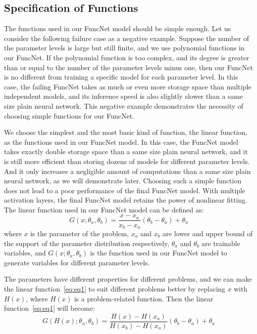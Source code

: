 \documentclass{article}
\begin{document}
\subsection{Specification of Functions} \label{sec:func}

The functions used in our FuncNet model should be simple enough. Let us consider the following failure case as a negative example. Suppose the number of the parameter levels is large but still finite, and we use polynomial functions in our FuncNet. If the polynomial function is too complex, and its degree is greater than or equal to the number of the parameter levels minus one, then our FuncNet is no different from training a specific model for each parameter level. In this case, the failing FuncNet takes as much or even more storage space than multiple independent models, and its inference speed is also slightly slower than a same size plain neural network. This negative example demonstrates the necessity of choosing simple functions for our FuncNet.

We choose the simplest and the most basic kind of function, the linear function, as the functions used in our FuncNet model. In this case, the FuncNet model takes exactly double storage space than a same size plain neural network, and it is still more efficient than storing dozens of models for different parameter levels. And it only increases a negligible amount of computations than a same size plain neural network, as we will demonstrate later. Choosing such a simple function does not lead to a poor performance of the final FuncNet model. With multiple activation layers, the final FuncNet model retains the power of nonlinear fitting. The linear function used in our FuncNet model can be defined as:
\begin{equation} \label{eq:eq1}
G(x; \theta_a, \theta_b)  = \frac{x-x_a}{x_b-x_a}(\theta_b-\theta_a) + \theta_a
\end{equation}
where $x$ is the parameter of the problem, $x_a$ and $x_b$ are lower and upper bound of the support of the parameter distribution respectively, $\theta_a$ and $\theta_b$ are trainable variables, and $G(x; \theta_a, \theta_b)$ is the function used in our FuncNet model to generate variables for different parameter levels.

The parameters have different properties for different problems, and we can make the linear function~\ref{eq:eq1} to suit different problems better by replacing $x$ with $H(x)$, where $H(x)$ is a problem-related function. Then the linear function~\ref{eq:eq1} will become:
\begin{equation} \label{eq:eq2}
G(H(x); \theta_a, \theta_b)  = \frac{H(x)-H(x_a)}{H(x_b)-H(x_a)}(\theta_b-\theta_a) + \theta_a
\end{equation}
\end{document}
